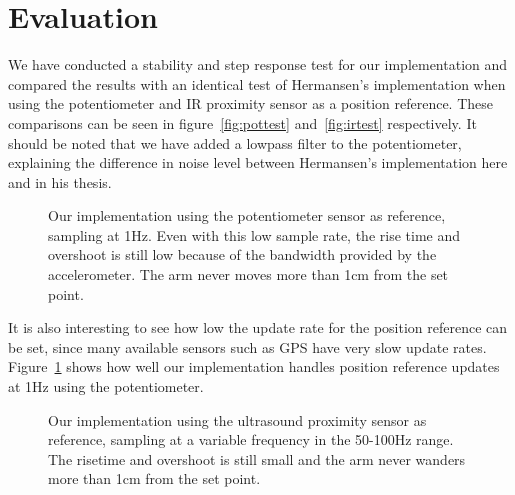 \begin{figure*}
	\centering
	\subfloat[][]{\setlength\figureheight{4cm}
		\setlength\figurewidth{6cm}
		
	}
	\subfloat[][]{\setlength\figureheight{4cm}
		\setlength\figurewidth{6cm}
		
	}
	\caption{(a): Our implementation using the IR proximity sensor as reference, sampling at \(\sim\)20Hz versus (b): 
	Hermansens's implementation using the IR proximity sensor as reference, sampling at 200Hz. For (a) the slow variations in 
altitude are a result of the measurements from the IR proximity sensor being quantized in 2cm steps giving the arm
free reign to drift within that range. The noise in (b) is not measurement noise, but rapid oscillation.}
\label{fig:irtest}
\vspace{3pt}
\hrulefill
\end{figure*}
\section{Evaluation}\label{sec:evaluation}
We have conducted a stability and step response test for our implementation and compared the results with an identical test of
Hermansen's implementation when using the potentiometer and IR proximity sensor as a position reference. These comparisons can be
seen in figure~\ref{fig:pottest} and~\ref{fig:irtest} respectively. It should be noted that we have added a lowpass filter to the
potentiometer, explaining the difference in noise level between Hermansen's implementation here and in his thesis.
\begin{figure}
	\setlength\figureheight{4cm}
	\setlength\figurewidth{6cm}
	
	\caption{Our implementation using the potentiometer sensor as reference, sampling at 1Hz. Even with this low sample rate, the
		rise time and overshoot is still low because of the bandwidth provided by the accelerometer. The arm never moves more than
		1cm from the set point.}
\label{fig:pot1hztest}
\end{figure}

It is also interesting to see how low the update rate for the position reference can be set, since many available sensors such as GPS 
have very slow update rates. Figure~\ref{fig:pot1hztest} shows how well our implementation handles position reference updates at
1Hz using the potentiometer.
\begin{figure}
	\setlength\figureheight{4cm}
	\setlength\figurewidth{6cm}
	
	\caption{Our implementation using the ultrasound proximity sensor as reference, sampling at a variable frequency in the 50-100Hz 
	range. The risetime and overshoot is still small and the arm never wanders more than 1cm from the set point.}
\label{fig:ultratest}
\end{figure}


